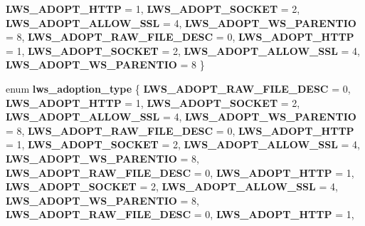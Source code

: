 \begin{DoxyCompactItemize}
{\bfseries L\+W\+S\+\_\+\+A\+D\+O\+P\+T\+\_\+\+H\+T\+TP} = 1, 
{\bfseries L\+W\+S\+\_\+\+A\+D\+O\+P\+T\+\_\+\+S\+O\+C\+K\+ET} = 2, 
{\bfseries L\+W\+S\+\_\+\+A\+D\+O\+P\+T\+\_\+\+A\+L\+L\+O\+W\+\_\+\+S\+SL} = 4, 
\newline
{\bfseries L\+W\+S\+\_\+\+A\+D\+O\+P\+T\+\_\+\+W\+S\+\_\+\+P\+A\+R\+E\+N\+T\+IO} = 8, 
{\bfseries L\+W\+S\+\_\+\+A\+D\+O\+P\+T\+\_\+\+R\+A\+W\+\_\+\+F\+I\+L\+E\+\_\+\+D\+E\+SC} = 0, 
{\bfseries L\+W\+S\+\_\+\+A\+D\+O\+P\+T\+\_\+\+H\+T\+TP} = 1, 
{\bfseries L\+W\+S\+\_\+\+A\+D\+O\+P\+T\+\_\+\+S\+O\+C\+K\+ET} = 2, 
\newline
{\bfseries L\+W\+S\+\_\+\+A\+D\+O\+P\+T\+\_\+\+A\+L\+L\+O\+W\+\_\+\+S\+SL} = 4, 
{\bfseries L\+W\+S\+\_\+\+A\+D\+O\+P\+T\+\_\+\+W\+S\+\_\+\+P\+A\+R\+E\+N\+T\+IO} = 8
 \}
\item 
\mbox{\label{group__sock-adopt_ga7e944a23efbb50187d34c62fb841d071}} 
enum {\bfseries lws\+\_\+adoption\+\_\+type} \{ \newline
{\bfseries L\+W\+S\+\_\+\+A\+D\+O\+P\+T\+\_\+\+R\+A\+W\+\_\+\+F\+I\+L\+E\+\_\+\+D\+E\+SC} = 0, 
{\bfseries L\+W\+S\+\_\+\+A\+D\+O\+P\+T\+\_\+\+H\+T\+TP} = 1, 
{\bfseries L\+W\+S\+\_\+\+A\+D\+O\+P\+T\+\_\+\+S\+O\+C\+K\+ET} = 2, 
{\bfseries L\+W\+S\+\_\+\+A\+D\+O\+P\+T\+\_\+\+A\+L\+L\+O\+W\+\_\+\+S\+SL} = 4, 
\newline
{\bfseries L\+W\+S\+\_\+\+A\+D\+O\+P\+T\+\_\+\+W\+S\+\_\+\+P\+A\+R\+E\+N\+T\+IO} = 8, 
{\bfseries L\+W\+S\+\_\+\+A\+D\+O\+P\+T\+\_\+\+R\+A\+W\+\_\+\+F\+I\+L\+E\+\_\+\+D\+E\+SC} = 0, 
{\bfseries L\+W\+S\+\_\+\+A\+D\+O\+P\+T\+\_\+\+H\+T\+TP} = 1, 
{\bfseries L\+W\+S\+\_\+\+A\+D\+O\+P\+T\+\_\+\+S\+O\+C\+K\+ET} = 2, 
\newline
{\bfseries L\+W\+S\+\_\+\+A\+D\+O\+P\+T\+\_\+\+A\+L\+L\+O\+W\+\_\+\+S\+SL} = 4, 
{\bfseries L\+W\+S\+\_\+\+A\+D\+O\+P\+T\+\_\+\+W\+S\+\_\+\+P\+A\+R\+E\+N\+T\+IO} = 8, 
{\bfseries L\+W\+S\+\_\+\+A\+D\+O\+P\+T\+\_\+\+R\+A\+W\+\_\+\+F\+I\+L\+E\+\_\+\+D\+E\+SC} = 0, 
{\bfseries L\+W\+S\+\_\+\+A\+D\+O\+P\+T\+\_\+\+H\+T\+TP} = 1, 
\newline
{\bfseries L\+W\+S\+\_\+\+A\+D\+O\+P\+T\+\_\+\+S\+O\+C\+K\+ET} = 2, 
{\bfseries L\+W\+S\+\_\+\+A\+D\+O\+P\+T\+\_\+\+A\+L\+L\+O\+W\+\_\+\+S\+SL} = 4, 
{\bfseries L\+W\+S\+\_\+\+A\+D\+O\+P\+T\+\_\+\+W\+S\+\_\+\+P\+A\+R\+E\+N\+T\+IO} = 8, 
{\bfseries L\+W\+S\+\_\+\+A\+D\+O\+P\+T\+\_\+\+R\+A\+W\+\_\+\+F\+I\+L\+E\+\_\+\+D\+E\+SC} = 0, 
\newline
{\bfseries L\+W\+S\+\_\+\+A\+D\+O\+P\+T\+\_\+\+H\+T\+TP} = 1, 

\end{DoxyCompactItemize}

